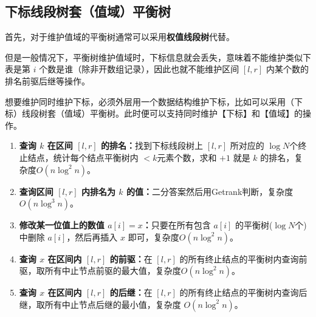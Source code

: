 \subsection{下标线段树套（值域）平衡树}
\par \noindent 首先，对于维护值域的平衡树通常可以采用\textbf{权值线段树}代替。
~\\
\par \noindent 但是一般情况下，平衡树维护值域时，下标信息就会丢失，意味着不能维护类似下表是第 $i$ 个数是谁（除非开数组记录），因此也就不能维护区间 $[l,r]$ 内某个数的排名前驱后继等操作。
~\\
\par \noindent 想要维护同时维护下标，必须外层用一个数据结构维护下标，比如可以采用（下标）线段树套（值域）平衡树。此时便可以支持同时维护【下标】和【值域】的操作。
~\\
\begin{enumerate}
\item \textbf{查询 $k$ 在区间 $[l,r]$ 的排名：}找到下标线段树上 $[l,r]$ 所对应的 $\log N$个终止结点，统计每个结点平衡树内 $<k$元素个数，求和 $+1$ 就是 $k$ 的排名，复杂度$O(n\log^2n)$。
\item \textbf{查询区间 $[l,r]$ 内排名为 $k$ 的值：}二分答案然后用Getrank判断，复杂度$O(n\log^3n)$。
\item \textbf{修改某一位值上的数值 $a[i]=x$：}只要在所有包含 $a[i]$ 的平衡树($\log N$个)中删除 $a[i]$，然后再插入 $x$ 即可，复杂度$O(n\log^2n)$。
\item \textbf{查询 $x$ 在区间内 $[l,r]$ 的前驱：}在 $[l,r]$ 的所有终止结点的平衡树内查询前驱，取所有中止节点前驱的最大值，复杂度$O(n\log^2n)$。
\item \textbf{查询 $x$ 在区间内 $[l,r]$ 的后继：}在 $[l,r]$ 的所有终止结点的平衡树内查询后继，取所有中止节点后继的最小值，复杂度 $O(n\log^2n)$。
\end{enumerate}

